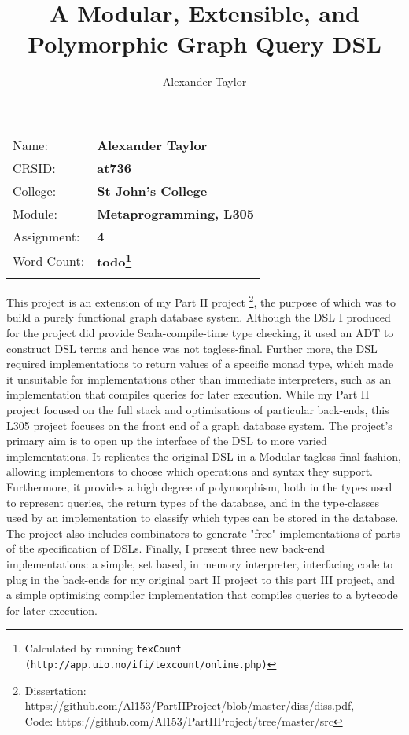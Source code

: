\documentclass{report}
\newcommand \2[0]{\textbf{2}}
\newcommand \3[0]{\textbf{3}}
\newcommand{\todo}[1]{\textbf{#1}}
\begin{document}
\title{A Modular, Extensible, and Polymorphic Graph Query DSL}
\author{Alexander Taylor}

\maketitle
{\large
\begin{tabular}{p{5cm}p{8cm}}
Name:       & \bf Alexander Taylor      \\
CRSID:      & \bf at736 \\
College:    & \bf St John's College  \\
Module:     & \bf Metaprogramming, L305 \\
Assignment: & \bf 4 \\
Word Count: & \bf \todo{todo}\footnote{Calculated by running \texttt{texCount (http://app.uio.no/ifi/texcount/online.php)}}   \\
                   \\ 
\end{tabular}
}



\abstract
This project is an extension of my Part II project \footnote{Dissertation: https://github.com/Al153/PartIIProject/blob/master/diss/diss.pdf,\\ Code: https://github.com/Al153/PartIIProject/tree/master/src}, the purpose of which was to build a purely functional graph database system. Although the DSL I produced for the project did provide Scala-compile-time type checking, it used an ADT to construct DSL terms and hence was not tagless-final. Further more, the DSL required implementations to return values of a specific monad type, which made it unsuitable for implementations other than immediate interpreters, such as an implementation that compiles queries for later execution. While my Part II project focused on the full stack and optimisations of particular back-ends, this L305 project focuses on the front end of a graph database system. The project's primary aim is to open up the interface of the DSL to more varied implementations. It replicates the original DSL in a Modular tagless-final fashion, allowing implementors to choose which operations and syntax they support. Furthermore, it provides a high degree of polymorphism, both in the types used to represent queries, the return types of the database, and in the type-classes used by an implementation to classify which types can be stored in the database. The project also includes combinators to generate "free" implementations of parts of the specification of DSLs. Finally, I present three new back-end implementations: a simple, set based, in memory interpreter, interfacing code to plug in the back-ends for my original part II project to this part III project, and a simple optimising compiler implementation that compiles queries to a bytecode for later execution.
\end{document}
